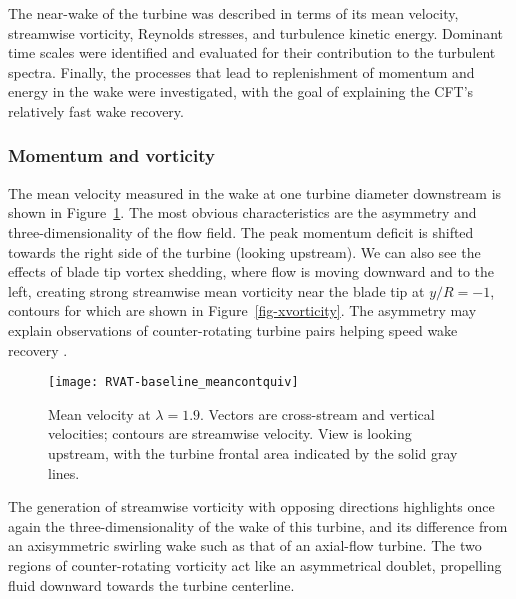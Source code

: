 The near-wake of the turbine was described in terms of its mean velocity,
streamwise vorticity, Reynolds stresses, and turbulence kinetic energy. Dominant
time scales were identified and evaluated for their contribution to the turbulent
spectra. Finally, the processes that lead to replenishment of momentum and
energy in the wake were investigated, with the goal of explaining the CFT's
relatively fast wake recovery.


\subsubsection{Momentum and vorticity}

The mean velocity measured in the wake at one turbine diameter downstream is
shown in Figure~\ref{fig:RVAT-baseline-meancontquiv}. The most obvious
characteristics are the asymmetry and three-dimensionality of the flow field.
The peak momentum deficit is shifted towards the right side of the turbine
(looking upstream). We can also see the effects of blade tip vortex shedding,
where flow is moving downward and to the left, creating strong streamwise mean
vorticity near the blade tip at $y/R=-1$, contours for which are shown in 
Figure~\ref{fig-xvorticity}. The asymmetry may explain observations of
counter-rotating turbine pairs helping speed wake recovery \cite{Dabiri2011}.

\begin{figure}
    \centering
    
    \texttt{[image: RVAT-baseline\_meancontquiv]}
    
    \caption{Mean velocity at $\lambda=1.9$. Vectors are cross-stream and
        vertical velocities; contours are streamwise velocity. View is looking
        upstream, with the turbine frontal area indicated by the solid gray lines.}
    
    \label{fig:RVAT-baseline-meancontquiv}
\end{figure}

The generation of streamwise vorticity with opposing directions highlights once
again the three-dimensionality of the wake of this turbine, and its difference
from an axisymmetric swirling wake such as that of an axial-flow turbine. The
two regions of counter-rotating vorticity act like an asymmetrical doublet,
propelling fluid downward towards the turbine centerline.

